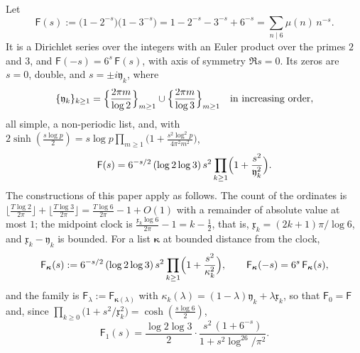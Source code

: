 \documentclass[11pt,reqno]{amsart}
\numberwithin{equation}{section}
\theoremstyle{plain}
\theoremstyle{definition}
\theoremstyle{remark}
\begin{document}
Let
\begin{equation}\label{eq:finite-euler}
 \mathsf F(s):=\bigl(1-2^{-s}\bigr)\bigl(1-3^{-s}\bigr)=1-2^{-s}-3^{-s}+6^{-s}=\sum_{n\mid6}\mu(n)\,n^{-s}.
\end{equation}
It is a Dirichlet series over the integers with an Euler product over the primes $2$ and $3$, and $\mathsf F(-s)=6^{s}\,\mathsf F(s)$, with axis of symmetry $\Re s=0$.  Its zeros are $s=0$, double, and $s=\pm i\mathfrak y_k$, where
\begin{equation}\label{eq:finite-euler-zeros}
 \{\mathfrak y_k\}_{k\ge1}=\Bigl\{\frac{2\pi m}{\log2}\Bigr\}_{m\ge1}\cup\Bigl\{\frac{2\pi m}{\log3}\Bigr\}_{m\ge1}\quad\text{in increasing order},
\end{equation}
all simple, a non-periodic list, and, with $2\sinh(\frac{s\log p}2)=s\log p\prod_{m\ge1}\bigl(1+\frac{s^2\log^2p}{4\pi^2m^2}\bigr)$,
\begin{equation}\label{eq:finite-euler-hadamard}
 \mathsf F(s)=6^{-s/2}\,(\log2\log3)\,s^{2}\prod_{k\ge1}\Bigl(1+\frac{s^2}{\mathfrak y_k^2}\Bigr).
\end{equation}
The constructions of this paper apply as follows.  The count of the ordinates is $\lfloor\frac{T\log2}{2\pi}\rfloor+\lfloor\frac{T\log3}{2\pi}\rfloor=\frac{T\log6}{2\pi}-1+O(1)$ with a remainder of absolute value at most $1$; the midpoint clock is $\frac{\mathfrak x_k\log6}{2\pi}-1=k-\frac12$, that is, $\mathfrak x_k=(2k+1)\pi/\log6$, and $\mathfrak x_k-\mathfrak y_k$ is bounded.  For a list $\boldsymbol{\kappa}$ at bounded distance from the clock,
\begin{equation}\label{eq:finite-euler-list}
 \mathsf F_{\boldsymbol{\kappa}}(s):=6^{-s/2}\,(\log2\log3)\,s^{2}\prod_{k\ge1}\Bigl(1+\frac{s^2}{\kappa_k^2}\Bigr),\qquad\mathsf F_{\boldsymbol{\kappa}}(-s)=6^{s}\,\mathsf F_{\boldsymbol{\kappa}}(s),
\end{equation}
and the family is $\mathsf F_\lambda:=\mathsf F_{\boldsymbol{\kappa}(\lambda)}$ with $\kappa_k(\lambda)=(1-\lambda)\mathfrak y_k+\lambda\mathfrak x_k$, so that $\mathsf F_0=\mathsf F$ and, since $\prod_{k\ge0}\bigl(1+s^2/\mathfrak x_k^2\bigr)=\cosh(\frac{s\log6}2)$,
\begin{equation}\label{eq:finite-euler-clock}
 \mathsf F_1(s)=\frac{\log2\log3}2\cdot\frac{s^{2}\,(1+6^{-s})}{1+s^2\log^26/\pi^2}.
\end{equation}
\end{document}
